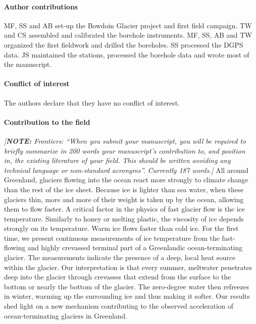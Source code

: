 \documentclass[utf8]{article}
\newcommand{\note}[1]{\textcolor{c0}{\emph{[\textbf{NOTE:} #1]}}}
\begin{document}
\paragraph{Author contributions}

    MF, SS and AB set-up the Bowdoin Glacier project and first field campaign.
    TW and CS assembled and calibrated the borehole instruments. MF, SS, AB and
    TW organized the first fieldwork and drilled the boreholes. SS processed
    the DGPS data. JS maintained the stations, processed the borehole data and
    wrote most of the manuscript.

\paragraph{Conflict of interest}

    The authors declare that they have no conflict of interest.

\paragraph{Contribution to the field}

    \note{Frontiers: ``When you submit your manuscript, you will be required to
          briefly summarize in 200 words your manuscript’s contribution to, and
          position in, the existing literature of your field. This should be
          written avoiding any technical language or non-standard acronyms''.
          Currently 187 words.}
    All around Greenland, glaciers flowing into the ocean react more strongly
    to climate change than the rest of the ice sheet. Because ice is lighter
    than sea water, when these glaciers thin, more and more of their weight is
    taken up by the ocean, allowing them to flow faster. A critical factor in
    the physics of fast glacier flow is the ice temperature. Similarly to honey
    or melting plastic, the viscosity of ice depends strongly on its
    temperature. Warm ice flows faster than cold ice.
    For the first time, we present continuous measurements of ice
    temperature from the fast-flowing and highly crevassed terminal part of a
    Greenlandic ocean-terminating glacier. The measurements indicate the
    presence of a deep, local heat source within the glacier. Our
    interpretation is that every summer, meltwater penetrates deep into the
    glacier through crevasses that extend from the surface to the bottom or
    nearly the bottom of the glacier. The zero-degree water then refreezes in
    winter, warming up the surrounding ice and thus making it softer.
    Our results shed light on a new mechanism contributing to the observed
    acceleration of ocean-terminating glaciers in Greenland.
\end{document}
